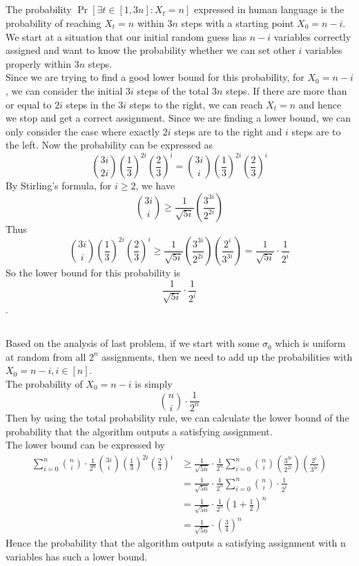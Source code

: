 \documentclass[12pt,letterpaper]{article}
\begin{document}
\subsection{}
The probability $\Pr\left[ \exists t\in[1,3n] :X_t=n\right]$
expressed in human language is the probability of reaching $X_t=n$ within $3n$ steps 
with a starting point $X_0=n-i$. We start at a situation that our initial random guess 
has $n-i$ variables correctly assigned and want to know the probability 
whether we can set other $i$ variables properly within $3n$ steps.\\
Since we are trying to find a good lower bound for this probability,
for $X_0=n-i$, we can consider the initial $3i$ steps of the total $3n$ steps.
If there are more than or equal to $2i$ steps in the $3i$ steps to the right, 
we can reach $X_t=n$ and hence we stop and get a correct assignment. 
Since we are finding a lower bound, 
we can only consider the case where exactly $2i$ steps are to the right
and $i$ steps are to the left.
Now the probability can be expressed as 
$$\binom{3i}{2i}\left(\frac{1}{3}\right)^{2i}\left(\frac{2}{3}\right)^i=\binom{3i}{i}\left(\frac{1}{3}\right)^{2i}\left(\frac{2}{3}\right)^i$$ 
By Stirling's formula, for $i\geq 2$, we have 
$$\binom{3i}{i}\geq \frac{1}{\sqrt{5i}}\left(\frac{3^{3i}}{2^{2i}}\right)$$
Thus $$\binom{3i}{i}\left(\frac{1}{3}\right)^{2i}\left(\frac{2}{3}\right)^i\geq 
\frac{1}{\sqrt{5i}}\left(\frac{3^{3i}}{2^{2i}}\right)\left(\frac{2^i}{3^{3i}}\right)
=\frac{1}{\sqrt{5i}}\cdot\frac{1}{2^i}$$
So the lower bound for this probability is 
$$\frac{1}{\sqrt{5i}}\cdot\frac{1}{2^i}$$.

\subsection{}
Based on the analysis of last problem,
if we start with some $\sigma_0$ which is uniform at random from all $2^n$ assignments,
then we need to add up the probabilities with $X_0=n-i,i\in[n]$.\\
The probability of $X_0=n-i$ is simply 
$$\binom{n}{i}\cdot\frac{1}{2^n}$$
Then by using the total probability rule, 
we can calculate the lower bound of the probability that the algorithm outputs a satisfying assignment.\\
The lower bound can be expressed by
\begin{align}
  \sum_{i=0}^{n}\binom{n}{i}\cdot\frac{1}{2^n}\binom{3i}{i}\left(\frac{1}{3}\right)^{2i}\left(\frac{2}{3}\right)^i
  &\geq \frac{1}{\sqrt{5n}}\cdot\frac{1}{2^n}\sum_{i=0}^{n}\binom{n}{i}\left(\frac{3^{3i}}{2^{2i}}\right)\left(\frac{2^i}{3^{3i}}\right)\\
  &=\frac{1}{\sqrt{5n}}\cdot\frac{1}{2^n}\sum_{i=0}^{n}\binom{n}{i}\cdot\frac{1}{2^i}\\
  &=\frac{1}{\sqrt{5n}}\cdot\frac{1}{2^n}(1+\frac{1}{2})^n\\
  &=\frac{1}{\sqrt{5n}}\cdot\left(\frac{3}{4}\right)^n
\end{align}
Hence the probability that the algorithm outputs a satisfying assignment
with n variables has such a lower bound.
\end{document}
